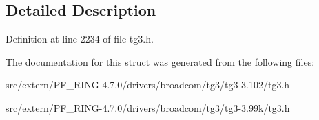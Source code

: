 \subsection{Detailed Description}


Definition at line 2234 of file tg3.h.



The documentation for this struct was generated from the following files:\begin{DoxyCompactItemize}
\item 
src/extern/PF\_\-RING-\/4.7.0/drivers/broadcom/tg3/tg3-\/3.102/tg3.h\item 
src/extern/PF\_\-RING-\/4.7.0/drivers/broadcom/tg3/tg3-\/3.99k/tg3.h\end{DoxyCompactItemize}
